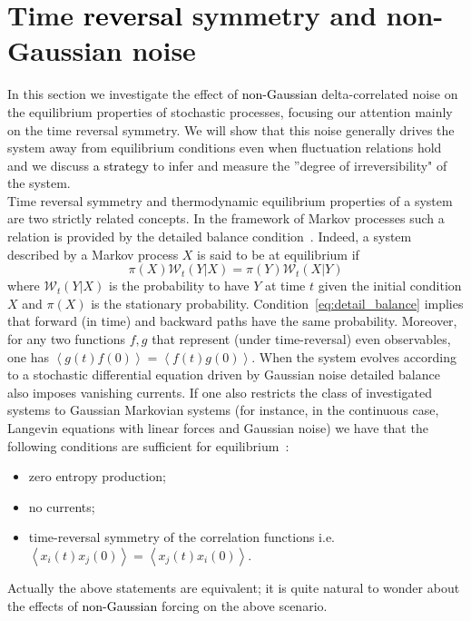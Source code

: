 \documentclass[12pt]{iopart}
\newcommand{\lx} {\left}
\newcommand{\rx} {\right}
\newcommand{\ave}[1] {\lx\langle #1 \rx\rangle}
\newcommand{\cW} {\mathcal{W}}
\begin{document}
\section{Time \textcolor{black}{reversal} symmetry and non-Gaussian noise}
\label{sec:ts}
In this section we investigate the effect of \textcolor{black}{non-Gaussian} delta-correlated noise on the equilibrium properties of stochastic processes, focusing our attention mainly on the time reversal symmetry. We will show that this noise generally drives the system away from equilibrium conditions even when fluctuation relations hold and we discuss \textcolor{black}{a strategy} to infer and measure the  ”degree of irreversibility" of the system.\\
Time reversal symmetry and thermodynamic equilibrium properties of a system are two strictly related concepts. 
In the framework of Markov processes such a relation is provided by the detailed balance condition~\cite{G90}. Indeed, a system described by a Markov process $X$ is said to be at equilibrium if 
\begin{equation}
    \pi(X)\cW_t(Y|X)=\pi(Y){\cW}_t(X|Y)
\label{eq:detail_balance}
\end{equation}
where $\cW_t(Y|X)$ is the probability to have $Y$ at time $t$ given the initial condition $X$ and $\pi(X)$ is the stationary probability. Condition~\ref{eq:detail_balance} implies that forward (in time) and backward paths have the same probability. Moreover, for any two functions $f,g$ that represent  (under time-reversal) even observables, one has $\ave{g(t)f (0) }=\ave{f(t) g (0) }$. When the system evolves according to a stochastic differential equation driven by Gaussian noise detailed balance also imposes vanishing currents. If one also restricts the class of investigated systems to Gaussian Markovian systems (for instance, in the continuous case, Langevin equations with linear forces and Gaussian noise) we have that the following conditions are sufficient for equilibrium~\textcolor{black}{\cite{Sekimoto2010,seifertrev}}:
\begin{itemize}
  \item  zero entropy production;
  \item no currents;
  \item time-reversal symmetry  of the correlation functions  i.e. $\ave{x_i(t)x_j(0)}=\ave{x_j(t)x_i(0)}$.
\end{itemize}
Actually  the above statements  are  equivalent;
it is quite natural to wonder about the effects of \textcolor{black}{non-Gaussian} forcing on the above scenario. \\
\end{document}
